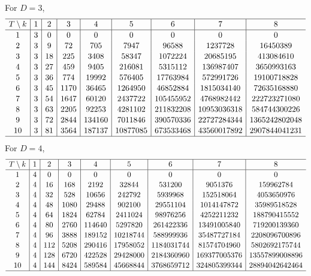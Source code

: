 \documentclass[10pt,a4paper]{amsart}
\numberwithin{equation}{section}
\begin{document}
For $D=3$,
\begin{gather*}
\setlength{\tabcolsep}{4.5pt}
\renewcommand{\arraystretch}{1.1}
\begin{tabular}{c|c|c|c|c|c|c|c|c}
\hline $T\setminus k$&1&2&3&4&5&6&7&8\\ \hline
1&3& 0& 0& 0& 0& 0& 0& 0\\
2&3& 9& 72& 705& 7947& 96588& 1237728& 16450389\\
3&3& 18& 225& 3408& 58347& 1072224& 20685195& 413084610\\
4&3& 27& 459& 9405& 216081& 5315112& 136987407& 3650993163\\
5&3& 36& 774& 19992& 576405& 17763984& 572991726& 19100718828\\
6&3& 45& 1170& 36465& 1264950& 46852884& 1815034140& 72635168880\\
7&3& 54& 1647& 60120& 2437722& 105455952& 4768982442& 222723271080\\
8&3& 63& 2205& 92253& 4281102& 211832208& 10953036318& 584744300226\\
9&3& 72& 2844& 134160& 7011846& 390570336& 22727284344& 1365242802048\\
10&3& 81& 3564& 187137& 10877085& 673533468& 43560017892& 2907844041231\\
\hline\end{tabular}\end{gather*}
For $D=4$,
\begin{gather*}
\setlength{\tabcolsep}{4.5pt}
\renewcommand{\arraystretch}{1.1}
\begin{tabular}{c|c|c|c|c|c|c|c|c}
\hline $T\setminus k$&1&2&3&4&5&6&7&8\\ \hline
1&4& 0& 0& 0& 0& 0& 0& 0\\
2&4& 16& 168& 2192& 32844& 531200& 9051376& 159962784\\
3&4& 32& 528& 10656& 242792& 5939968& 152518064& 4053650976\\
4&4& 48& 1080& 29488& 902100& 29551104& 1014147872& 35989518528\\
5&4& 64& 1824& 62784& 2411024& 98976256& 4252211232& 188790415552\\
6&4& 80& 2760& 114640& 5297820& 261422336& 13491005840& 719200139360\\
7&4& 96& 3888& 189152& 10218744& 588999936& 35487727184& 2208096700896\\
8&4& 112& 5208& 290416& 17958052& 1184031744& 81574704960& 5802692175744\\
9&4& 128& 6720& 422528& 29428000& 2184360960& 169377005376& 13557899008896\\
10&4& 144& 8424& 589584& 45668844& 3768659712& 324805399344& 28894042642464\\
\hline
\end{tabular}
\end{gather*}
\end{document}
